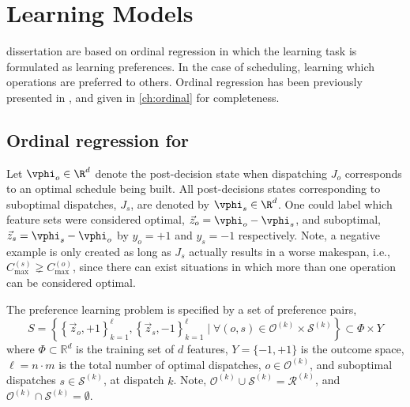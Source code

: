 
\chapter{Learning Models}\label{ch:prefmodels} 

 dissertation are based on ordinal regression in which the learning task is formulated as learning preferences. In the case of scheduling, learning which operations are preferred to others. Ordinal regression has been previously presented in \cite{Ru06:PPSN}, and given in \cref{ch:ordinal} for completeness. 

\section{Ordinal regression for \jsp}
Let $\vphi_{o}\in\R^d$ denote the post-decision state when dispatching $J_o$ corresponds to an optimal schedule being built. All post-decisions states corresponding to suboptimal dispatches, $J_s$, are denoted by $\vphi_{s}\in\R^d$. One could label which feature sets were considered optimal, $\vec{z}_{o}=\vphi_{o}-\vphi_{s}$, and suboptimal, $\vec{z}_{s}=\vphi_{s}-\vphi_{o}$ by $y_o=+1$ and $y_s=-1$ respectively. 
Note, a negative example is only created as long as $J_s$ actually results in a worse makespan, i.e., $C_{\max}^{(s)}\gneq C_{\max}^{(o)}$, since there can exist situations in which more than one operation can be considered optimal.

The preference learning problem is specified by a set of preference pairs,
\begin{equation}
S = \left\{\left\{\vec{z}_o,+1\right\}_{k=1}^{\ell},\left\{\vec{z}_s,-1\right\}_{k=1}^{\ell}
\;|\;\forall (o,s) \in \mathcal{O}^{(k)} \times \mathcal{S}^{(k)}
\right\}\subset \Phi\times Y \label{eq:S:jsp}
\end{equation}
where $\Phi\subset \mathbb{R}^d$ is the training set of $d$ features, $Y=\{-1,+1\}$ is the outcome space, $\ell=n\cdot m$ is the total number of optimal dispatches, $o\in\mathcal{O}^{(k)}$, and suboptimal dispatches $s\in \mathcal{S}^{(k)}$, at dispatch $k$. Note, $\mathcal{O}^{(k)}\cup\mathcal{S}^{(k)}=\mathcal{R}^{(k)}$, and $\mathcal{O}^{(k)}\cap\mathcal{S}^{(k)}=\emptyset$. 


